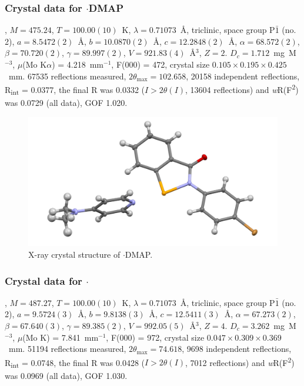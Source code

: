 \begin{refsection}
\subsubsection{Crystal data for \texorpdfstring{$ \cdot $DMAP}{C20 H18 Br N3 O Se}}
, $M=475.24$, $T=100.00(10)$~K, $ \lambda=0.71073 $~\AA, triclinic, space group P$\bar{1}$ (no. 2), $a = 8.5472(2)$~\AA, $b = 10.0870(2)$~\AA, $c = 12.2848(2)$~\AA, $\alpha = 68.572(2)$\degree, $\beta = 70.720(2)$\degree, $\gamma = 89.997(2)$\degree, $V = 921.83(4)$~\AA$^{3}$, $Z = 2$. $D_{c}= 1.712$~mg~M$^{-3}$, $\mu$(Mo K$\alpha$) = 4.218~mm$^{-1}$, F(000) = 472, crystal size $0.105 \times 0.195 \times 0.425$~mm. 67535 reflections measured, $2\theta_{\max}=102.658$\degree, 20158 independent reflections, R\textsubscript{int} = 0.0377, the final R was 0.0332 ($I > 2\theta(I)$, 13604 reflections) and \textit{w}R(F\textsuperscript{2}) was 0.0729 (all data), GOF 1.020.

\begin{figure}
  \includegraphics[width=0.6\linewidth]{Figures/ebs-4br-dmap-xtal.pdf}
  \caption{X-ray crystal structure of \texorpdfstring{$ \cdot $DMAP}{C20 H18 Br N3 O Se}.}
\end{figure}

\subsubsection{Crystal data for \texorpdfstring{$ \cdot $}{C22 H20 Br N2 O Se}}
, $M=487.27$, $T=100.00(10)$~K, $ \lambda=0.71073 $~\AA, triclinic, space group P$\bar{1}$ (no. 2), $a = 9.5724(3)$~\AA, $b = 9.8138(3)$~\AA, $c = 12.5411(3)$~\AA, $\alpha = 67.273(2)$\degree, $\beta = 67.640(3)$\degree, $\gamma = 89.385(2)$\degree, $V = 992.05(5)$~\AA$^{3}$, $Z = 4$. $D_{c}= 3.262$~mg~M$^{-3}$, $\mu$(Mo K\a) = 7.841~mm$^{-1}$, F(000) = 972, crystal size $0.047 \times 0.309 \times 0.369$~mm. 51194 reflections measured, $2\theta_{\max}=74.618$\degree, 9698 independent reflections, R\textsubscript{int} = 0.0748, the final R was 0.0428 ($I > 2\theta(I)$, 7012 reflections) and \textit{w}R(F\textsuperscript{2}) was 0.0969 (all data), GOF 1.030.


\end{refsection}
